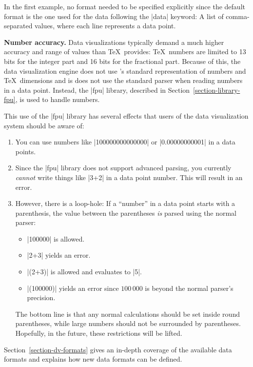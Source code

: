 In the first example, no format needed to be specified explicitly since the
default format is the one used for the data following the |data| keyword: A
list of comma-separated values, where each line represents a data point.

\medskip
\textbf{Number accuracy.}\label{section-dv-expressions}
Data visualizations typically demand a much higher accuracy and range of values
than \TeX\ provides: \TeX\ numbers are limited to 13 bits for the integer part
and 16 bits for the fractional part. Because of this, the data visualization
engine does not use \pgfname's standard representation of numbers and \TeX\
dimensions and is does not use the standard parser when reading numbers in a
data point. Instead, the |fpu| library, described in
Section~\ref{section-library-fpu}, is used to handle numbers.

This use of the |fpu| library has several effects that users of the data
visualization system should be aware of:
%
\begin{enumerate}
    \item You can use numbers like |100000000000000| or |0.00000000001| in a
        data points.
    \item Since the |fpu| library does not support advanced parsing, you
        currently \emph{cannot} write things like |3+2| in a data point number.
        This will result in an error.
    \item However, there is a loop-hole: If a ``number'' in a data point starts
        with a parenthesis, the value between the parentheses \emph{is} parsed
        using the normal parser:
        \begin{itemize}
            \item |100000| is allowed.
            \item |2+3| yields an error.
            \item |(2+3)| is allowed and evaluates to |5|.
            \item |(100000)| yields an error since $100\,000$ is beyond the
                normal parser's precision.
        \end{itemize}
        The bottom line is that any normal calculations should be set inside
        round parentheses, while large numbers should not be surrounded by
        parentheses. Hopefully, in the future, these restrictions will be
        lifted.
\end{enumerate}

Section~\ref{section-dv-formats} gives an in-depth coverage of the available
data formats and explains how new data formats can be defined.


